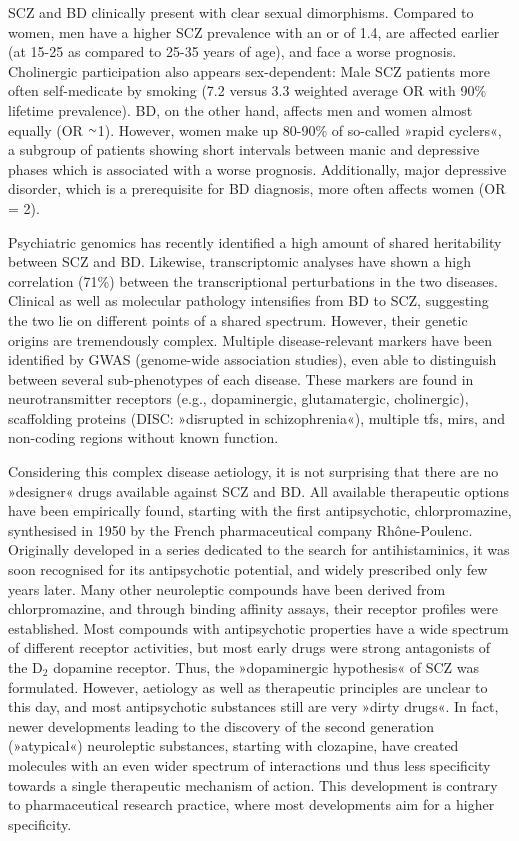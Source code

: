 SCZ and BD clinically present with clear sexual dimorphisms. Compared to women, men have a higher SCZ prevalence with an \ac{or} of 1.4, are affected earlier (at 15-25 as compared to 25-35 years of age), and face a worse prognosis\cite{Leger2016}. Cholinergic participation also appears sex-dependent: Male SCZ patients more often self-medicate by smoking (7.2 versus 3.3 weighted average OR with 90\% lifetime prevalence)\cite{DeLeon2005}. BD, on the other hand, affects men and women almost equally (OR $\smallsim$\num{1}). However, women make up 80-90\% of so-called »rapid cyclers«, a subgroup of patients showing short intervals between manic and depressive phases which is associated with a worse prognosis\cite{Berger2014}. Additionally, major depressive disorder, which is a prerequisite for BD diagnosis, more often affects women\cite{Berger2014} (OR = 2).

Psychiatric genomics has recently identified a high amount of shared heritability between SCZ and BD\cite{Anttila2018}. Likewise, transcriptomic analyses have shown a high correlation (71\%) between the transcriptional perturbations in the two diseases. Clinical as well as molecular pathology intensifies from BD to SCZ, suggesting the two lie on different points of a shared spectrum. However, their genetic origins are tremendously complex. Multiple disease-relevant markers have been identified by GWAS (genome-wide association studies), even able to distinguish between several sub-phenotypes of each disease\cite{Ruderfer2018}. These markers are found in neurotransmitter receptors (e.g., dopaminergic, glutamatergic, cholinergic), scaffolding proteins (DISC: »disrupted in schizophrenia«), multiple \acp{tf}, \acp{mir}, and non-coding regions without known function\cite{Harrison2015, Henriksen2017, Kanazawa2017}.

Considering this complex disease aetiology, it is not surprising that there are no »designer« drugs available against SCZ and BD. All available therapeutic options have been empirically found, starting with the first antipsychotic, chlorpromazine, synthesised in 1950 by the French pharmaceutical company Rhône-Poulenc. Originally developed in a series dedicated to the search for antihistaminics, it was soon recognised for its antipsychotic potential, and widely prescribed only few years later. Many other neuroleptic compounds have been derived from chlorpromazine, and through binding affinity assays, their receptor profiles were established. Most compounds with antipsychotic properties have a wide spectrum of different receptor activities, but most early drugs were strong antagonists of the D$_2$ dopamine receptor. Thus, the »dopaminergic hypothesis« of SCZ was formulated. However, aetiology as well as therapeutic principles are unclear to this day, and most antipsychotic substances still are very »dirty drugs«. In fact, newer developments leading to the discovery of the second generation (»atypical«) neuroleptic substances, starting with clozapine, have created molecules with an even wider spectrum of interactions und thus less specificity towards a single therapeutic mechanism of action. This development is contrary to pharmaceutical research practice, where most developments aim for a higher specificity.

